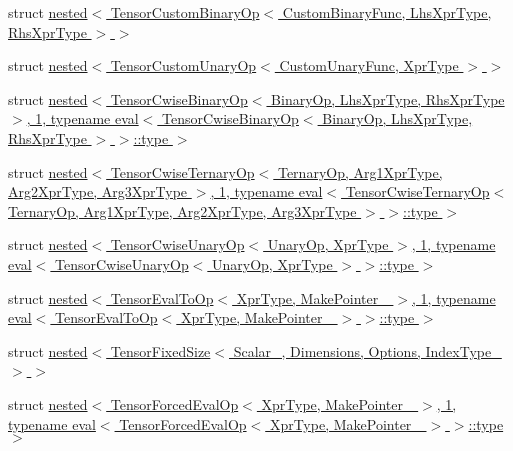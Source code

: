\begin{DoxyCompactItemize}
\item 
struct \hyperlink{struct_eigen_1_1internal_1_1nested_3_01_tensor_custom_binary_op_3_01_custom_binary_func_00_01_lh0ebeaddb698d52bc5880e3a8cd1df790}{nested$<$ Tensor\+Custom\+Binary\+Op$<$ Custom\+Binary\+Func, Lhs\+Xpr\+Type, Rhs\+Xpr\+Type $>$ $>$}
\item 
struct \hyperlink{struct_eigen_1_1internal_1_1nested_3_01_tensor_custom_unary_op_3_01_custom_unary_func_00_01_xpr_type_01_4_01_4}{nested$<$ Tensor\+Custom\+Unary\+Op$<$ Custom\+Unary\+Func, Xpr\+Type $>$ $>$}
\item 
struct \hyperlink{struct_eigen_1_1internal_1_1nested_3_01_tensor_cwise_binary_op_3_01_binary_op_00_01_lhs_xpr_typec43a72cea85b54495a72d72517229ff1}{nested$<$ Tensor\+Cwise\+Binary\+Op$<$ Binary\+Op, Lhs\+Xpr\+Type, Rhs\+Xpr\+Type $>$, 1, typename eval$<$ Tensor\+Cwise\+Binary\+Op$<$ Binary\+Op, Lhs\+Xpr\+Type, Rhs\+Xpr\+Type $>$ $>$\+::type $>$}
\item 
struct \hyperlink{struct_eigen_1_1internal_1_1nested_3_01_tensor_cwise_ternary_op_3_01_ternary_op_00_01_arg1_xpr_t853695dee4735ec9f7eb99fe0132afb2}{nested$<$ Tensor\+Cwise\+Ternary\+Op$<$ Ternary\+Op, Arg1\+Xpr\+Type, Arg2\+Xpr\+Type, Arg3\+Xpr\+Type $>$, 1, typename eval$<$ Tensor\+Cwise\+Ternary\+Op$<$ Ternary\+Op, Arg1\+Xpr\+Type, Arg2\+Xpr\+Type, Arg3\+Xpr\+Type $>$ $>$\+::type $>$}
\item 
struct \hyperlink{struct_eigen_1_1internal_1_1nested_3_01_tensor_cwise_unary_op_3_01_unary_op_00_01_xpr_type_01_4_1f8fce5c50cd854f51c6d2039d1e9327}{nested$<$ Tensor\+Cwise\+Unary\+Op$<$ Unary\+Op, Xpr\+Type $>$, 1, typename eval$<$ Tensor\+Cwise\+Unary\+Op$<$ Unary\+Op, Xpr\+Type $>$ $>$\+::type $>$}
\item 
struct \hyperlink{struct_eigen_1_1internal_1_1nested_3_01_tensor_eval_to_op_3_01_xpr_type_00_01_make_pointer___01_98b103532d565d0e57efbce4aca129cf}{nested$<$ Tensor\+Eval\+To\+Op$<$ Xpr\+Type, Make\+Pointer\+\_\+ $>$, 1, typename eval$<$ Tensor\+Eval\+To\+Op$<$ Xpr\+Type, Make\+Pointer\+\_\+ $>$ $>$\+::type $>$}
\item 
struct \hyperlink{struct_eigen_1_1internal_1_1nested_3_01_tensor_fixed_size_3_01_scalar___00_01_dimensions_00_01_o3bfcf7dc4c1a033b438e61c7069c6497}{nested$<$ Tensor\+Fixed\+Size$<$ Scalar\+\_\+, Dimensions, Options, Index\+Type\+\_\+ $>$ $>$}
\item 
struct \hyperlink{struct_eigen_1_1internal_1_1nested_3_01_tensor_forced_eval_op_3_01_xpr_type_00_01_make_pointer__9f18abfe403ccefd01462ad1cf126848}{nested$<$ Tensor\+Forced\+Eval\+Op$<$ Xpr\+Type, Make\+Pointer\+\_\+ $>$, 1, typename eval$<$ Tensor\+Forced\+Eval\+Op$<$ Xpr\+Type, Make\+Pointer\+\_\+ $>$ $>$\+::type $>$}

\end{DoxyCompactItemize}
